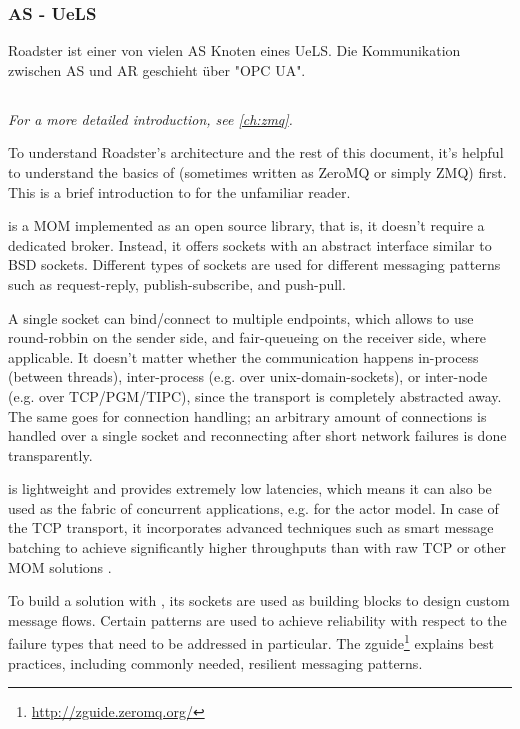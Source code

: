 \subsubsection{AS - UeLS}
Roadster ist einer von vielen AS Knoten eines UeLS. Die Kommunikation
zwischen AS und AR geschieht über "OPC UA".


\subsection{\zmq}
\emph{For a more detailed introduction, see \autoref{ch:zmq}.}

To understand Roadster's architecture and the rest of this document, it's
helpful to understand the basics of \zmq (sometimes written as ZeroMQ or simply
ZMQ) first. This is a brief introduction to \zmq for the unfamiliar reader.

\zmq is a \gls{MOM} implemented as an open source library, that is, it doesn't
require a dedicated broker. Instead, it offers sockets with an abstract
interface similar to \acrshort{BSD} sockets. Different types of sockets are used for
different messaging patterns such as request-reply, publish-subscribe, and
push-pull.

A single socket can bind/connect to multiple endpoints, which allows \zmq to
use round-robbin on the sender side, and fair-queueing on the receiver side,
where applicable. It doesn't matter whether the communication happens
in-process (between threads), inter-process (e.g. over \glspl{unix-domain-socket}), or
inter-node (e.g. over \acrshort{TCP}/\acrshort{PGM}/\acrshort{TIPC}), since the transport is completely
abstracted away. The same goes for connection handling; an arbitrary amount of
connections is handled over a single socket and reconnecting after short
network failures is done transparently.

\zmq is lightweight and provides extremely low latencies, which means it can
also be used as the fabric of concurrent applications, e.g. for the actor
model. In case of the TCP transport, it incorporates advanced techniques such
as smart message batching to achieve significantly higher throughputs than with
raw TCP or other \gls{MOM} solutions \cite[Figure 2, Middleware evaluation and
prototyping, p.~4]{cern:new-cmw}.

To build a solution with \zmq, its sockets are used as building blocks to
design custom message flows. Certain patterns are used to achieve reliability
with respect to the failure types that need to be addressed in particular.  The
zguide\footnote{\url{http://zguide.zeromq.org/}} explains best practices,
including commonly needed, resilient messaging patterns.

